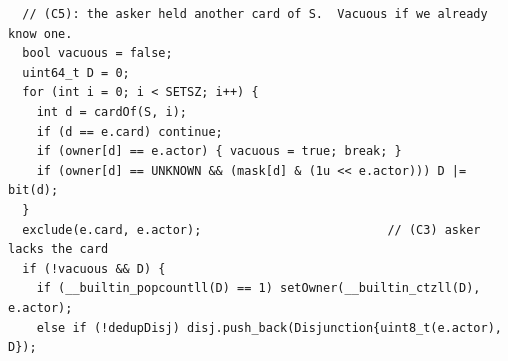 \begin{lstlisting}
  // (C5): the asker held another card of S.  Vacuous if we already know one.
  bool vacuous = false;
  uint64_t D = 0;
  for (int i = 0; i < SETSZ; i++) {
    int d = cardOf(S, i);
    if (d == e.card) continue;
    if (owner[d] == e.actor) { vacuous = true; break; }
    if (owner[d] == UNKNOWN && (mask[d] & (1u << e.actor))) D |= bit(d);
  }
  exclude(e.card, e.actor);                          // (C3) asker lacks the card
  if (!vacuous && D) {
    if (__builtin_popcountll(D) == 1) setOwner(__builtin_ctzll(D), e.actor);
    else if (!dedupDisj) disj.push_back(Disjunction{uint8_t(e.actor), D});
\end{lstlisting}
